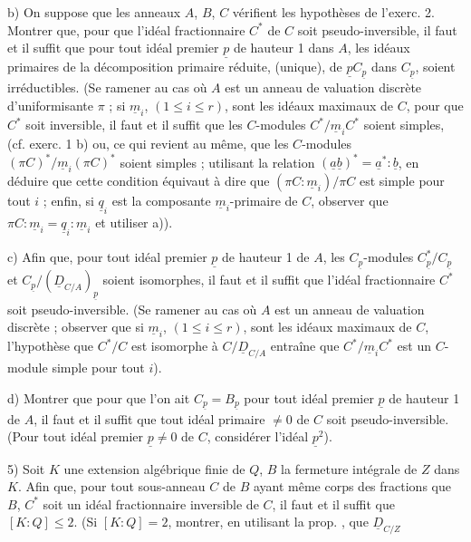 b) On suppose que les anneaux $A$, $B$, $C$ vérifient les hypothèses de l'exerc. 2. Montrer que, pour que l'idéal fractionnaire $C^*$ de $C$ soit pseudo-inversible, il faut et il suffit que pour tout idéal premier $\underline p$ de hauteur 1 dans $A$, les idéaux primaires de la décomposition primaire réduite, (unique), de $\underline p C_{\underline p}$ dans $C_{\underline p}$, soient irréductibles. (Se ramener au cas où $A$ est un anneau de valuation discrète d'uniformisante $\pi$ ; si $\underline m_i$, $(1\leq i\leq r)$, sont les idéaux maximaux de $C$, pour que $C^*$ soit inversible, il faut et il suffit que les $C$-modules $C^*/\underline m_i C^*$ soient simples, (cf. exerc. 1 b) ou, ce qui revient au même, que les $C$-modules $(\pi C)^*/\underline m_i(\pi C)^*$ soient simples ; utilisant la relation $(\underline a\underline b)^*=\underline a^*:\underline b$, en déduire que cette condition équivaut à dire que $(\pi C:\underline m_i)/\pi C$ est simple pour tout $i$ ; enfin, si $\underline q_i$ est la composante $\underline m_i$-primaire de $C$, observer que $\pi C:\underline m_i=\underline q_i:\underline m_i$ et utiliser a)).

c) Afin que, pour tout idéal premier $\underline p$ de hauteur 1 de $A$, les $C_{\underline p}$-modules $C^*_{\underline p}/C_{\underline p}$ et $C_{\underline p}/(\underline D_{C/A})_{\underline p}$ soient isomorphes, il faut et il suffit que l'idéal fractionnaire $C^*$ soit pseudo-inversible. (Se ramener au cas où $A$ est un anneau de valuation discrète ; observer que si $\underline m_i$, $(1\leq i\leq r)$, sont les idéaux maximaux de $C$, l'hypothèse que $C^*/C$ est isomorphe à $C/\underline D_{C/A}$ entraîne que $C^*/\underline m_i C^*$ est un $C$-module simple pour tout $i$).

d) Montrer que pour que l'on ait $C_{\underline p}=B_{\underline p}$ pour tout idéal premier $\underline p$ de hauteur 1 de $A$, il faut et il suffit que tout idéal primaire $\ne 0$ de $C$ soit pseudo-inversible. (Pour tout idéal premier $\underline p\ne0$ de $C$, considérer l'idéal $\underline p^2$).

5) Soit $K$ une extension algébrique finie de $Q$, $B$ la fermeture intégrale de $Z$ dans $K$. Afin que, pour tout sous-anneau $C$ de $B$ ayant même corps des fractions que $B$, $C^*$ soit un idéal fractionnaire inversible de $C$, il faut et il suffit que $[K:Q]\leq2$. (Si $[K:Q]=2$, montrer, en utilisant la prop. \quad, que $\underline D_{C/Z}$

